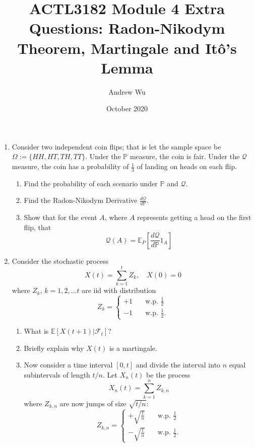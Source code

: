 \documentclass[11pt]{article}
\title{\textbf{ACTL3182 Module 4 Extra Questions: Radon-Nikodym Theorem, Martingale and It\^o's Lemma}}
\author{Andrew Wu}
\date{October 2020}
\newcommand{\E}{\mathbb{E}}
\newcommand{\PR}{\mathbb{P}}
\newcommand{\Q}{\mathcal{Q}}
\begin{document}
	\maketitle
	\begin{enumerate}
		\item Consider two independent coin flips; that is let the sample space be $\Omega:=\{HH, HT, TH, TT\}$. Under the $\PR$ measure, the coin is fair. Under the $\Q$ measure, the coin has a probability of $\frac{1}{3}$ of landing on heads on each flip. 
		\begin{enumerate}
			\item Find the probability of each scenario under $\PR$ and $\Q$.
			\item Find the Radon-Nikodym Derivative $\frac{d\Q}{d\PR}$.
			\item Show that for the event $A$, where $A$ represents getting a head on the first flip, that
			\[	\Q(A) = \E_{P}\left[\frac{d\Q}{d\PR}1_{A}\right]
					\]
 		\end{enumerate}
		\item Consider the stochastic process 
		\[	X(t) = \sum_{k=1}^{t}Z_{k},\quad X(0) = 0
			\]
		where $Z_{k}$, $k=1,2,...t$ are iid with distribution 
		\[	Z_{k} = \begin{cases}
						+1 &  \quad \text{w.p. } \frac{1}{2} \\
						-1 & \quad \text{w.p. } \frac{1}{2}.
						\end{cases}
			\]
			\begin{enumerate}
				\item What is $\E[X(t+1)|\mathcal{F}_{t}]$?
				\item Briefly explain why $X(t)$ is a martingale.
				\item Now consider a time interval $[0, t]$ and divide the interval into $n$ equal subintervals of length $t/n$. Let $X_{n}(t)$ be the process
				\[	X_{n}(t) = \sum_{k=1}^{n}Z_{k, n}
				\]
				where $Z_{k, n}$ are now jumps of size $\sqrt{t/n}$:
				\[	Z_{k, n} = \begin{cases}
				+\sqrt{\frac{t}{n}} &  \quad \text{w.p. } \frac{1}{2} \\[5pt]
				-\sqrt{\frac{t}{n}} & \quad \text{w.p. } \frac{1}{2}.
				\end{cases}
				\]
				

\end{enumerate}
\end{enumerate}
\end{document}

